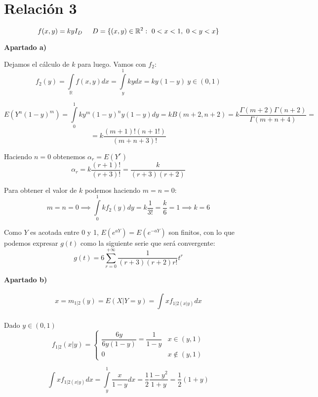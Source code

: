 \documentclass[openany]{book}
\begin{document}
\chapter{Relación 3}

\begin{exercise}
    $$ f (x,y) = k y I_{D}\hspace{5mm} D = \{(x,y) \in \mathbb{R}^2:\ 0<x<1,\ 0<y<x\} $$
    
    \begin{flushright}
        \textbf{Apartado a)}
    \end{flushright}


    Dejamos el cálculo de $ k $ para luego. Vamos con $ f_{2} $:
    $$ f_{2}(y) = \int\limits_{\mathbb{R}}^{}f(x,y)dx = \int\limits_{y}^{1} ky dx = ky(1-y)\ y \in (0,1) $$

    $$ E(Y^{n}(1-y)^{m}) = \int\limits_{0}^{1}k y ^{m}(1-y)^{n} y (1-y)dy = kB(m+2,n+2) = k \dfrac{\Gamma(m+2)\Gamma(n+2)}{\Gamma(m+n+4)} = $$
    $$ = k \dfrac{(m+1)!(n+1!)}{(m+n+3)!} $$

    Haciendo $ n = 0 $ obtenemos $ \alpha_{r} = E(Y^{r}) $
    $$ \alpha_{r} = k \dfrac{(r+1)!}{(r+3)!} = \dfrac{k}{(r+3)(r+2)} $$

    Para obtener el valor de $ k $ podemos haciendo $ m = n = 0 $:
    $$ m = n = 0 \implies \int\limits_{0}^{1}k f_{2}(y)dy = k \dfrac{1}{3!} = \dfrac{k}{6} = 1 \implies k = 6 $$

    Como $ Y $ es acotada entre 0 y 1, $ E(e^{aY}) = E(e^{-aY}) $ son finitos, con lo que podemos expresar $ g(t) $ como la siguiente serie que será convergente:
    $$ g(t) = 6\sum\limits_{r=0}^{+\infty} \dfrac{1}{(r+3)(r+2)r!} t ^{r} $$


    \begin{flushright}
        \textbf{Apartado b)}
    \end{flushright}


    $$ x = m_{1|2}(y) = E(X|Y = y) = \int\limits_{}^{} x f_{1|2(x|y)}dx $$

    Dado $ y \in (0,1) $
    $$ f_{1|2}(x|y) = \left\{
    \begin{array}{lr}
        \dfrac{6y}{6y(1-y)} = \dfrac{1}{1-y} & x \in (y,1)\\ 
        0 & x \not \in (y,1)
    \end{array}
    \right.$$

    $$ \int\limits_{}^{} x f_{1|2(x|y)}dx = \int\limits_{y}^{1} \dfrac{x}{1-y}dx = \dfrac{1}{2} \dfrac{1-y^2}{1+y} = \dfrac{1}{2}(1+y) $$
    

\end{exercise}
\end{document}
